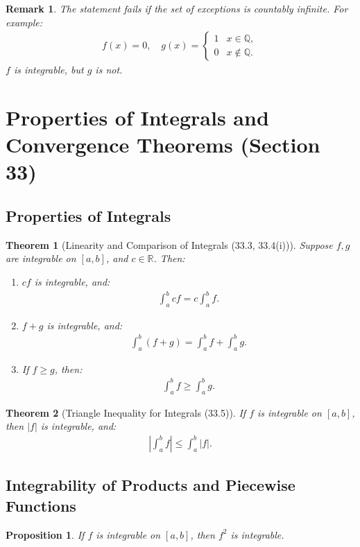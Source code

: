 \documentclass[9pt]{article}
\theoremstyle{definition}
\theoremstyle{plain}
\newtheorem{theorem}{Theorem}
\newtheorem{proposition}{Proposition}
\newtheorem{remark}{Remark}
\begin{document}
\begin{remark}
The statement fails if the set of exceptions is countably infinite. For example:
\begin{align}
f(x) = 0, \quad g(x) =
\begin{cases}
1 & x \in \mathbb{Q}, \\
0 & x \notin \mathbb{Q}.
\end{cases}
\end{align}
$ f $ is integrable, but $ g $ is not.
\end{remark}
\section*{Properties of Integrals and Convergence Theorems (Section 33)}

\subsection*{Properties of Integrals}
\begin{theorem}[Linearity and Comparison of Integrals (33.3, 33.4(i))]
Suppose $ f, g $ are integrable on $ [a, b] $, and $ c \in \mathbb{R} $. Then:
\begin{enumerate}
    \item $ cf $ is integrable, and:
    \begin{align}
    \int_a^b cf = c \int_a^b f.
    \end{align}
    \item $ f + g $ is integrable, and:
    \begin{align}
    \int_a^b (f + g) = \int_a^b f + \int_a^b g.
    \end{align}
    \item If $ f \geq g $, then:
    \begin{align}
    \int_a^b f \geq \int_a^b g.
    \end{align}
\end{enumerate}
\end{theorem}

\begin{theorem}[Triangle Inequality for Integrals (33.5)]
If $ f $ is integrable on $ [a, b] $, then $ |f| $ is integrable, and:
\begin{align}
\left| \int_a^b f \right| \leq \int_a^b |f|.
\end{align}
\end{theorem}

\subsection*{Integrability of Products and Piecewise Functions}
\begin{proposition}
If $ f $ is integrable on $ [a, b] $, then $ f^2 $ is integrable.
\end{proposition}
\end{document}

